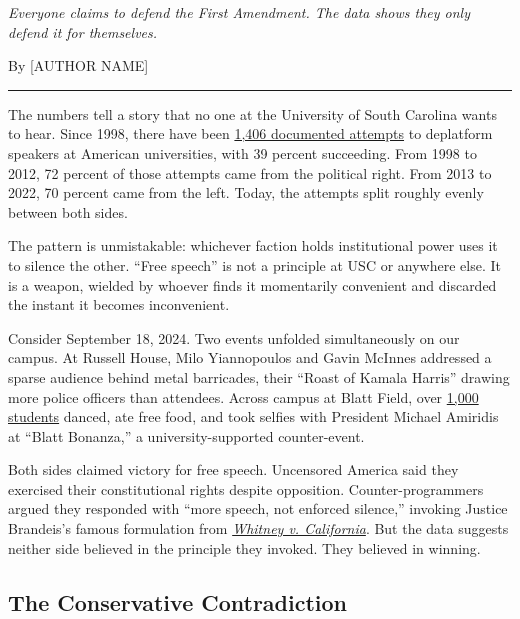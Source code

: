 \documentclass[11pt]{article}
\begin{document}
\vspace{0.3cm}
{\large\textit{Everyone claims to defend the First Amendment. The data shows they only defend it for themselves.}}

\vspace{0.3cm}
By [AUTHOR NAME]

\vspace{0.5cm}
\hrule
\vspace{0.5cm}

\onehalfspacing

The numbers tell a story that no one at the University of South Carolina wants to hear. Since 1998, there have been \href{https://www.thefire.org/research-learn/campus-deplatforming-database}{1,406 documented attempts} to deplatform speakers at American universities, with 39 percent succeeding. From 1998 to 2012, 72 percent of those attempts came from the political right. From 2013 to 2022, 70 percent came from the left. Today, the attempts split roughly evenly between both sides.

The pattern is unmistakable: whichever faction holds institutional power uses it to silence the other. ``Free speech'' is not a principle at USC or anywhere else. It is a weapon, wielded by whoever finds it momentarily convenient and discarded the instant it becomes inconvenient.

Consider September 18, 2024. Two events unfolded simultaneously on our campus. At Russell House, Milo Yiannopoulos and Gavin McInnes addressed a sparse audience behind metal barricades, their ``Roast of Kamala Harris'' drawing more police officers than attendees. Across campus at Blatt Field, over \href{https://www.dailygamecock.com/article/2024/09/over-1000-students-attend-blatt-bonanza-during-controversial-campus-event-news-grady}{1,000 students} danced, ate free food, and took selfies with President Michael Amiridis at ``Blatt Bonanza,'' a university-supported counter-event.

Both sides claimed victory for free speech. Uncensored America said they exercised their constitutional rights despite opposition. Counter-programmers argued they responded with ``more speech, not enforced silence,'' invoking Justice Brandeis's famous formulation from \href{https://supreme.justia.com/cases/federal/us/274/357/}{\textit{Whitney v. California}}. But the data suggests neither side believed in the principle they invoked. They believed in winning.

\subsection{The Conservative Contradiction}
\end{document}
